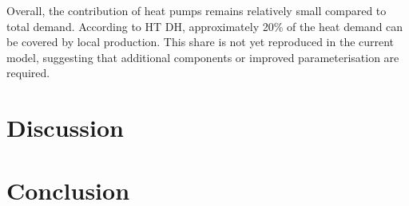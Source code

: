 Overall, the contribution of heat pumps remains relatively small compared to total demand. According to HT DH, approximately 20\% of the heat demand can be covered by local production. This share is not yet reproduced in the current model, suggesting that additional components or improved parameterisation are required.

\section{Discussion}

\section{Conclusion}